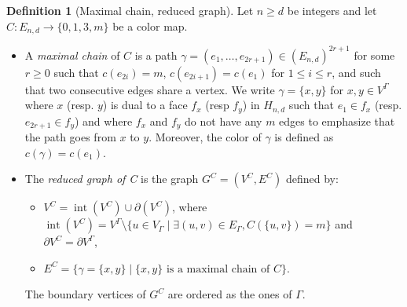 \documentclass[11pt,a4paper]{amsart}
\DeclareMathOperator{\interior}{int}
\numberwithin{equation}{section}
\theoremstyle{definition}
\newtheorem{definition}[theorem]{Definition}
\begin{document}
\begin{definition}[Maximal chain, reduced graph]
    \label{def:skeleton}
    Let $n\geqslant d$ be integers and let 
    $C:E_{n,d}\rightarrow\{0,1,3,m\}$ be a color map. 
    \begin{itemize}
        \item  A \textit{maximal chain} of $C$ is a path 
        $\gamma = (e_1,\ldots,e_{2r+1}) \in (E_{n, d})^{2r+1}$ for some 
        $r \geqslant 0$ such that 
        $c(e_{2i})=m$, $c(e_{2i+1})=c(e_1)$ for $1 \leqslant i \leqslant r$, 
        and such that two consecutive edges share a vertex.
        We write $\gamma=\{ x, y \}$  for $x,y \in V^\Gamma$ 
        where $x$ (resp. $y$) is dual to a face $f_x$ (resp $f_y$) 
        in $H_{n, d}$ such that $e_1 \in f_x$ (resp. $e_{2r+1} \in f_y$) 
        and where $f_x$ and $f_y$ do not have any $m$ edges
        to emphasize that the path 
        goes from $x$ to $y$. 
    Moreover, the color of $\gamma$ is defined as $c(\gamma)=c(e_1)$. 
    \\
    \item The \textit{reduced graph of C} is the graph $G^C=(V^C,E^C)$ 
    defined by:
    \begin{itemize}
    \item $V^C=\interior(V^C)\cup \partial (V^C)$, where $\interior(V^C) = 
    V^{\Gamma} \setminus \{u\in V_{\Gamma} \mid \exists 
    (u,v)\in E_{\Gamma}, C(\{u,v\})=m\}$ and $\partial V^C=\partial V^{\Gamma}$,
    \item $E^C=\{ \gamma = \{x,y\} \mid \{x,y\}\text{ is a maximal chain of }C\}.$
    \end{itemize}
    The boundary vertices of $G^C$ are ordered as 
    the ones of $\Gamma$.
    \end{itemize}
\end{definition}
\end{document}
